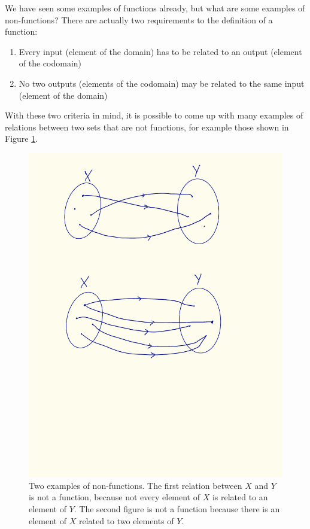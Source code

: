     We have seen some examples of functions already, but what are some examples of non-functions? There are actually two requirements to the definition of a function:
    \begin{enumerate}
        \item Every input (element of the domain) has to be related to an output (element of the codomain)
        \item No two outputs (elements of the codomain) may be related to the same input (element of the domain)
    \end{enumerate}
    With these two criteria in mind, it is possible to come up with many examples of relations between two sets that are not functions, for example those shown in Figure \ref{fig:non_functions}.
    \begin{figure}[H] \centering
        \includegraphics{images/non_functions}
        \caption{Two examples of non-functions. The first relation between $X$ and $Y$ is not a function, because not every element of $X$ is related to an element of $Y$. The second figure is not a function because there is an element of $X$ related to two elements of $Y$.}
        \label{fig:non_functions}
    \end{figure}

